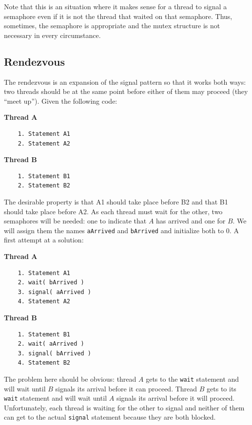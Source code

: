 Note that this is an situation where it makes sense for a thread to signal a semaphore even if it is not the thread that waited on that semaphore. Thus, sometimes, the semaphore is appropriate and the mutex structure is not necessary in every circumstance.

\subsection*{Rendezvous}
The rendezvous is an expansion of the signal pattern so that it works both ways: two threads should be at the same point before either of them may proceed (they ``meet up''). Given the following code:

\begin{multicols}{2}
\textbf{Thread A}\vspace{-2em}
  \begin{verbatim}
	1. Statement A1
	2. Statement A2
  \end{verbatim}
\columnbreak
\textbf{Thread B}\vspace{-2em}
  \begin{verbatim}
	1. Statement B1
	2. Statement B2
  \end{verbatim}
\end{multicols}
\vspace{-2em}

The desirable property is that A1 should take place before B2 and that B1 should take place before A2. As each thread must wait for the other, two semaphores will be needed: one to indicate that $A$ has arrived and one for $B$. We will assign them the names \texttt{aArrived} and \texttt{bArrived} and initialize both to 0. A first attempt at a solution:

\begin{multicols}{2}
\textbf{Thread A}\vspace{-2em}
  \begin{verbatim}
	1. Statement A1
	2. wait( bArrived )
	3. signal( aArrived )
	4. Statement A2
  \end{verbatim}
\columnbreak
\textbf{Thread B}\vspace{-2em}
  \begin{verbatim}
	1. Statement B1
	2. wait( aArrived )
	3. signal( bArrived )
	4. Statement B2
  \end{verbatim}
\end{multicols}
\vspace{-2em}


The problem here should be obvious: thread $A$ gets to the \texttt{wait} statement and will wait until $B$ signals its arrival before it can proceed. Thread $B$ gets to its \texttt{wait} statement and will wait until $A$ signals its arrival before it will proceed. Unfortunately, each thread is waiting for the other to signal and neither of them can get to the actual \texttt{signal} statement because they are both blocked. 

